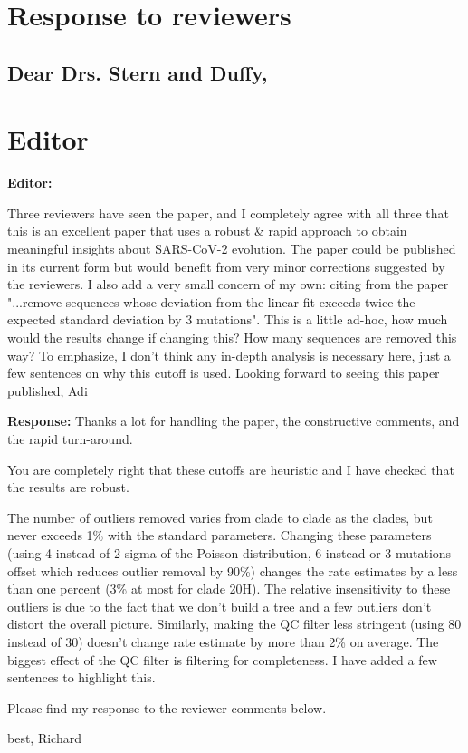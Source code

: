 \documentclass[aps,rmp,onecolumn]{revtex4-1}
\newcommand{\editor}[1]{\textbf{Editor:} #1\vskip 5mm}
\newcommand{\response}[1]{{\it {\color{response}\textbf{Response:} #1}}\vskip 5mm}
\begin{document}
\section*{Response to reviewers}

\subsection*{Dear Drs. Stern and Duffy,}

\section*{Editor}

\editor{

Three reviewers have seen the paper, and I completely agree with all three that this is an excellent paper that uses a robust \& rapid approach to obtain meaningful insights about SARS-CoV-2 evolution. The paper could be published in its current form but would benefit from very minor corrections suggested by the reviewers.
I also add a very small concern of my own: citing from the paper "...remove sequences whose deviation from the linear fit exceeds twice the expected standard deviation by 3 mutations". This is a little ad-hoc, how much would the results change if changing this? How many sequences are removed this way? To emphasize, I don't think any in-depth analysis is necessary here, just a few sentences on why this cutoff is used.
Looking forward to seeing this paper published,
Adi
}

\response{Thanks a lot for handling the paper, the constructive comments, and the rapid turn-around.

You are completely right that these cutoffs are heuristic and I have checked that the results are robust.

The number of outliers removed varies from clade to clade as the clades, but never exceeds 1\% with the standard parameters.
Changing these parameters (using 4 instead of 2 sigma of the Poisson distribution, 6 instead or 3 mutations offset which reduces outlier removal by 90\%) changes the rate estimates by a less than one percent (3\% at most for clade 20H).
The relative insensitivity to these outliers is due to the fact that we don't build a tree and a few outliers don't distort the overall picture.
Similarly, making the QC filter less stringent (using 80 instead of 30) doesn't change rate estimate by more than 2\% on average. The biggest effect of the QC filter is filtering for completeness.
I have added a few sentences to highlight this.

Please find my response to the reviewer comments below.

best,
Richard

}
\end{document}
